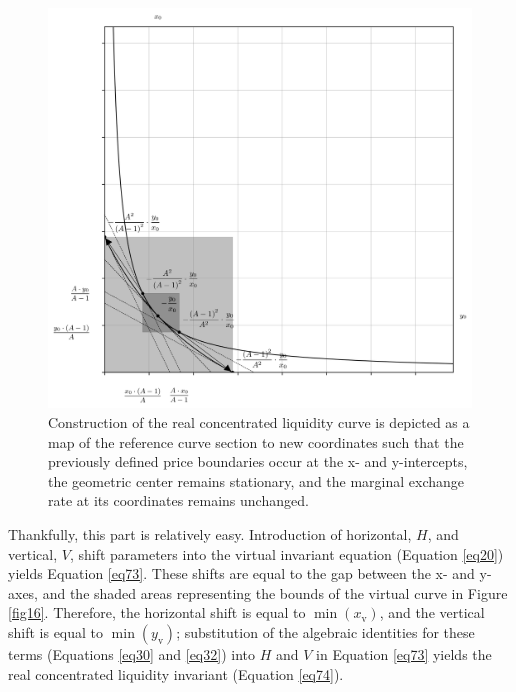 \documentclass{article}
\begin{document}
\begin{figure}[ht]
    \centering
    \includegraphics[width=\textwidth]{fig17.png}
    \captionsetup{
        justification=raggedright,
        singlelinecheck=false,
        font=small,
        labelfont=bf,
        labelsep=quad,
        format=plain
    }
    \caption{Construction of the real concentrated liquidity curve is depicted as a map of the reference curve section to new coordinates such that the previously defined price boundaries occur at the x- and y-intercepts, the geometric center remains stationary, and the marginal exchange rate at its coordinates remains unchanged. }
    \label{fig17}
\end{figure}

Thankfully, this part is relatively easy. Introduction of horizontal, $H$, and vertical, $V$, shift parameters into the virtual invariant equation (Equation \ref{eq20}) yields Equation \ref{eq73}. These shifts are equal to the gap between the x- and y-axes, and the shaded areas representing the bounds of the virtual curve in Figure \ref{fig16}. Therefore, the horizontal shift is equal to $\min \left( x_{\text{v}} \right)$, and the vertical shift is equal to $\min \left( y_{\text{v}} \right)$; substitution of the algebraic identities for these terms (Equations \ref{eq30} and \ref{eq32}) into $H$ and $V$ in Equation \ref{eq73} yields the real concentrated liquidity invariant (Equation \ref{eq74}).
\end{document}
